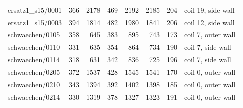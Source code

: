 \begin{tabular}{@{}lrrrrrrl@{}}
ersatz1\_s15/0001 & \num{366} & \num{2178} & \num{469} & \num{2192} & \num{2185} & \num{204} & coil 19, side wall \\
ersatz1\_s15/0003 & \num{394} & \num{1814} & \num{482} & \num{1980} & \num{1841} & \num{206} & coil 12, side wall \\
schwaechen/0105 & \num{358} & \num{645} & \num{383} & \num{895} & \num{743} & \num{173} & coil 7, outer wall \\
schwaechen/0110 & \num{331} & \num{635} & \num{354} & \num{864} & \num{734} & \num{190} & coil 7, side wall \\
schwaechen/0114 & \num{318} & \num{631} & \num{342} & \num{836} & \num{725} & \num{196} & coil 7, side wall \\
schwaechen/0205 & \num{372} & \num{1537} & \num{428} & \num{1545} & \num{1541} & \num{170} & coil 0, outer wall \\
schwaechen/0210 & \num{343} & \num{1394} & \num{392} & \num{1402} & \num{1398} & \num{185} & coil 0, outer wall \\
schwaechen/0214 & \num{330} & \num{1319} & \num{378} & \num{1327} & \num{1323} & \num{191} & coil 0, outer wall \\
\bottomrule\end{tabular}

